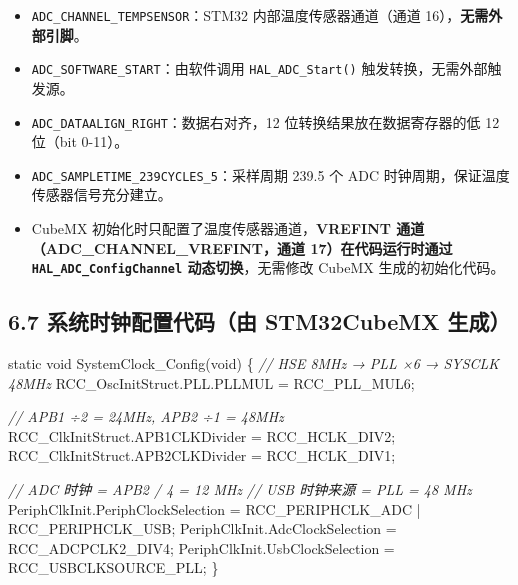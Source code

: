 \documentclass[
  chinese,
  UTF8,
  oneside,
  openany]{ctexbook}
\newenvironment{Shaded}{}{}
\newcommand{\CommentTok}[1]{\textcolor[rgb]{0.38,0.63,0.69}{\textit{#1}}}
\newcommand{\DataTypeTok}[1]{\textcolor[rgb]{0.56,0.13,0.00}{#1}}
\newcommand{\NormalTok}[1]{#1}
\newcommand{\OperatorTok}[1]{\textcolor[rgb]{0.40,0.40,0.40}{#1}}
\providecommand{\tightlist}{%
  \setlength{\itemsep}{0pt}\setlength{\parskip}{0pt}}
\begin{document}
\begin{itemize}
\tightlist
\item
  \texttt{ADC\_CHANNEL\_TEMPSENSOR}：STM32 内部温度传感器通道（通道
  16），\textbf{无需外部引脚}。
\item
  \texttt{ADC\_SOFTWARE\_START}：由软件调用 \texttt{HAL\_ADC\_Start()}
  触发转换，无需外部触发源。
\item
  \texttt{ADC\_DATAALIGN\_RIGHT}：数据右对齐，12
  位转换结果放在数据寄存器的低 12 位（bit 0-11）。
\item
  \texttt{ADC\_SAMPLETIME\_239CYCLES\_5}：采样周期 239.5 个 ADC
  时钟周期，保证温度传感器信号充分建立。
\item
  CubeMX 初始化时只配置了温度传感器通道，\textbf{VREFINT
  通道（ADC\_CHANNEL\_VREFINT，通道 17）在代码运行时通过
  \texttt{HAL\_ADC\_ConfigChannel} 动态切换}，无需修改 CubeMX
  生成的初始化代码。
\end{itemize}

\subsection{6.7 系统时钟配置代码（由 STM32CubeMX
生成）}\label{ux7cfbux7edfux65f6ux949fux914dux7f6eux4ee3ux7801ux7531-stm32cubemx-ux751fux6210}

\begin{Shaded}
\begin{Highlighting}[]
\DataTypeTok{static} \DataTypeTok{void}\NormalTok{ SystemClock\_Config}\OperatorTok{(}\DataTypeTok{void}\OperatorTok{)}
\OperatorTok{\{}
    \CommentTok{// HSE 8MHz → PLL ×6 → SYSCLK 48MHz}
\NormalTok{    RCC\_OscInitStruct}\OperatorTok{.}\NormalTok{PLL}\OperatorTok{.}\NormalTok{PLLMUL }\OperatorTok{=}\NormalTok{ RCC\_PLL\_MUL6}\OperatorTok{;}

    \CommentTok{// APB1 ÷2 = 24MHz, APB2 ÷1 = 48MHz}
\NormalTok{    RCC\_ClkInitStruct}\OperatorTok{.}\NormalTok{APB1CLKDivider }\OperatorTok{=}\NormalTok{ RCC\_HCLK\_DIV2}\OperatorTok{;}
\NormalTok{    RCC\_ClkInitStruct}\OperatorTok{.}\NormalTok{APB2CLKDivider }\OperatorTok{=}\NormalTok{ RCC\_HCLK\_DIV1}\OperatorTok{;}

    \CommentTok{// ADC 时钟 = APB2 / 4 = 12 MHz}
    \CommentTok{// USB 时钟来源 = PLL = 48 MHz}
\NormalTok{    PeriphClkInit}\OperatorTok{.}\NormalTok{PeriphClockSelection }\OperatorTok{=}\NormalTok{ RCC\_PERIPHCLK\_ADC }\OperatorTok{|}\NormalTok{ RCC\_PERIPHCLK\_USB}\OperatorTok{;}
\NormalTok{    PeriphClkInit}\OperatorTok{.}\NormalTok{AdcClockSelection }\OperatorTok{=}\NormalTok{ RCC\_ADCPCLK2\_DIV4}\OperatorTok{;}
\NormalTok{    PeriphClkInit}\OperatorTok{.}\NormalTok{UsbClockSelection }\OperatorTok{=}\NormalTok{ RCC\_USBCLKSOURCE\_PLL}\OperatorTok{;}
\OperatorTok{\}}
\end{Highlighting}
\end{Shaded}
\end{document}
